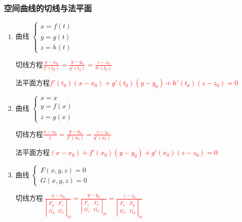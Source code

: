 \documentclass{article} %
\begin{document}
\subsubsection{空间曲线的切线与法平面}
\begin{enumerate}
    \item 曲线
        $\left\{ \begin{array}{l}
            x=f(t)\\y=g(t)\\z=h(t)
        \end{array}\right.$\par
        切线方程\textcolor{red}{$\displaystyle\frac{x-x_0}{f'(t_0)}=\frac{y-y_0}{g'(t_0)}=\frac{z-z_0}{h'(t_0)}$}\vspace{2mm}\par
        法平面方程\textcolor{red}{$f'(t_0)(x-x_0)+g'(t_0)(y-y_0)+h'(t_0)(z-z_0)=0$}
    \item 曲线
        $\left\{ \begin{array}{l}
            x=x\\y=f(x)\\z=g(x)
        \end{array}\right.$\par
        切线方程\textcolor{red}{$\displaystyle\frac{x-x_0}{1}=\frac{y-y_0}{f'(x_0)}=\frac{z-z_0}{g'(x_0)}$}\vspace{2mm}\par
        法平面方程\textcolor{red}{$(x-x_0)+f'(x_0)(y-y_0)+g'(x_0)(z-z_0)=0$}
    \item 曲线
        $\left\{ \begin{array}{l}
            F(x,y,z)=0\\G(x,y,z)=0
        \end{array}\right.$\par
        切线方程\textcolor{red}{
            $\displaystyle
                \frac{x-x_0}{\left|\begin{array}{cc}F_y&F_z\\G_y&G_z\end{array}\right|_M}
                =
                \frac{y-y_0}{\left|\begin{array}{cc}F_z&F_x\\G_z&G_x\end{array}\right|_M}
                =
                \frac{z-z_0}{\left|\begin{array}{cc}F_x&F_y\\G_x&G_y\end{array}\right|_M}$}\vspace{2mm}\par

\end{enumerate}
\end{document}
